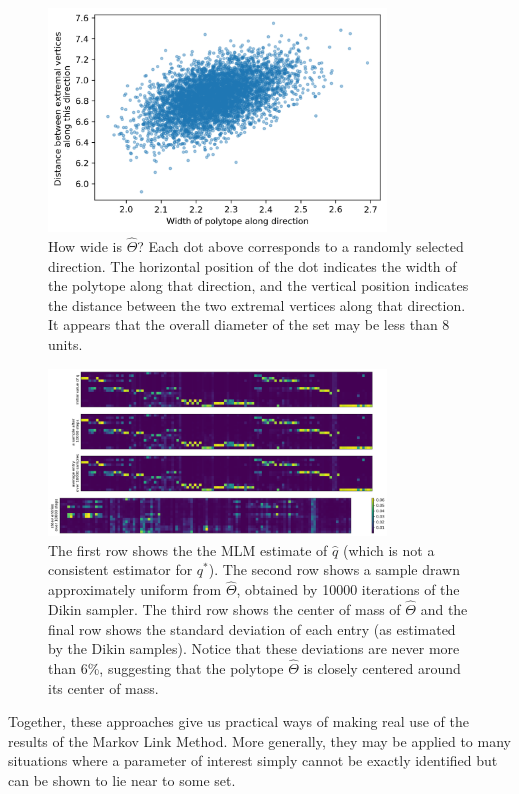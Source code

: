 \begin{figure}
\includegraphics[width=0.8\textwidth]{pics/allenwidths}
\caption{How wide is $\hat \Theta$?  Each dot above corresponds to a randomly selected direction.  The horizontal position of the dot indicates the width of the polytope along that direction, and the vertical position indicates the distance between the two extremal vertices along that direction.  It appears that the overall diameter of the set may be less than 8 units.\label{fig:allenwidths}}
\end{figure}

\begin{figure}
\includegraphics[width=0.8\textwidth]{pics/allenavg}
\caption{\label{fig:allenoutput}The first row shows the the MLM estimate of $\hat q$ (which is not a consistent estimator for $q^*$).  The second row shows a sample drawn approximately uniform from $\hat \Theta$, obtained by 10000 iterations of the Dikin sampler.  The third row shows the center of mass of $\hat \Theta$ and the final row shows the standard deviation of each entry (as estimated by the Dikin samples).  Notice that these deviations are never more than 6\%, suggesting that the polytope $\hat \Theta$ is closely centered around its center of mass.\label{fig:allenavg}}
\end{figure}

Together, these approaches give us practical ways of making real use of the results of the Markov Link Method.  More generally, they may be applied to many situations where a parameter of interest simply cannot be exactly identified but can be shown to lie near to some set.  

